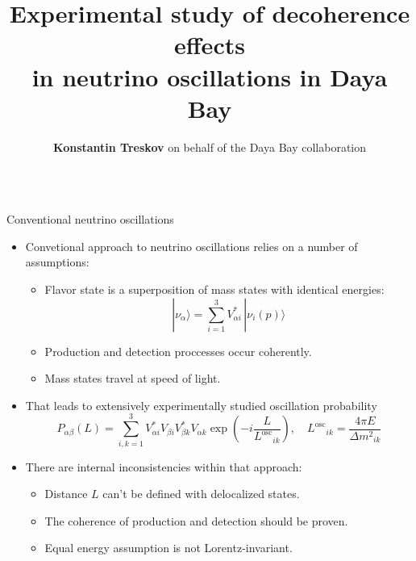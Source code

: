 \documentclass[usenames, dvipsnames]{beamer}
\author[]{\textbf{Konstantin Treskov} on behalf of the Daya Bay collaboration}
\title{Experimental study of decoherence effects\\ in neutrino oscillations in
Daya Bay}
\institute{Joint Institute for Nuclear Research, Dubna, Russia}
\newcommand{\Losc}{\ensuremath{L^{\text{osc}}}}
\newcommand{\Dm}{\ensuremath{\Delta m^2}}
\newcommand{\Important}{\textcolor{BrickRed}}
\newcommand{\Regular}{\textcolor{DeepBlue}}
\newcommand{\regitem}{\item[\Regular{$\bullet$}]}
\newcommand{\impitem}{\item[\Important{$\bullet$}]}
\begin{document}
\begin{frame}[fragile]
\begin{columns}[T]

    \hspace*{-2.5cm}
\begin{column}{.47\textwidth}
\begin{block}{Conventional neutrino oscillations}
\begin{itemize}
    \regitem Convetional approach to neutrino oscillations relies on a number of
        assumptions:
        \begin{itemize}
            \item Flavor state is a superposition of mass states with
                identical energies:
                \begin{equation*}
                    | \nu_\alpha \rangle = \sum_{i=1}^{3} V^*_{\alpha i}\, |
                    \nu_i(p) \rangle
                \end{equation*}
            \item Production and detection proccesses occur coherently.
            \item Mass states travel at speed of light.
        \end{itemize}
    \item That leads to extensively experimentally studied oscillation probability
    \begin{equation*}
        P_{\alpha\beta}(L) = \sum_{i,k=1}^3 V^*_{\alpha i} V_{\beta i}
        V^*_{\beta k}
        V_{\alpha k} \exp \left( -i \frac{L}{\Losc_{ik}}\right), \quad
        \ensuremath{\Losc_{ik} = \dfrac{4 \pi E}{\Dm_{ik}}}
    \end{equation*}
    \impitem There are internal inconsistencies within that approach:
        \begin{itemize}
            \item  Distance \ensuremath{L} can't be defined with delocalized
                states.
            \item The coherence of production and detection should be proven.
            \item Equal energy assumption is not Lorentz-invariant.
        \end{itemize}
\end{itemize}
\end{block}


\end{column}
\end{columns}
\end{frame}
\end{document}
